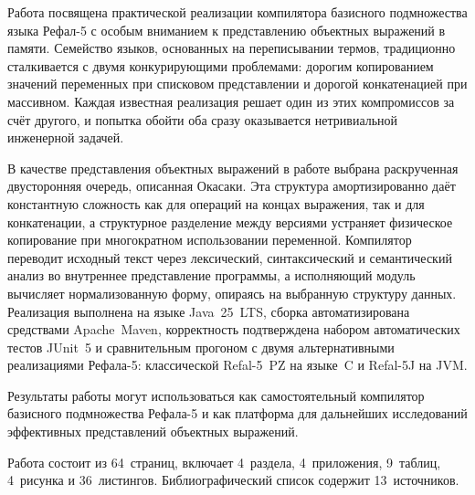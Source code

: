 Работа посвящена практической реализации компилятора базисного подмножества языка
Рефал-5 с особым вниманием к представлению объектных выражений в памяти. Семейство
языков, основанных на переписывании термов, традиционно сталкивается с двумя
конкурирующими проблемами: дорогим копированием значений переменных при списковом
представлении и дорогой конкатенацией при массивном. Каждая известная реализация
решает один из этих компромиссов за счёт другого, и попытка обойти оба сразу
оказывается нетривиальной инженерной задачей.

В качестве представления объектных выражений в работе выбрана раскрученная
двусторонняя очередь, описанная Окасаки. Эта структура амортизированно даёт
константную сложность как для операций на концах выражения, так и для конкатенации,
а структурное разделение между версиями устраняет физическое копирование при
многократном использовании переменной. Компилятор переводит исходный текст через
лексический, синтаксический и семантический анализ во внутреннее представление
программы, а исполняющий модуль вычисляет нормализованную форму, опираясь на
выбранную структуру данных. Реализация выполнена на языке Java~25~LTS, сборка
автоматизирована средствами Apache~Maven, корректность подтверждена набором
автоматических тестов JUnit~5 и сравнительным прогоном с двумя альтернативными
реализациями Рефала-5: классической Refal-5~PZ на языке~C и Refal-5J на JVM.

Результаты работы могут использоваться как самостоятельный компилятор базисного
подмножества Рефала-5 и как платформа для дальнейших исследований эффективных
представлений объектных выражений.


Работа состоит из 64~страниц, включает 4~раздела, 4~приложения, 9~таблиц,
4~рисунка и 36~листингов. Библиографический список содержит 13~источников.
